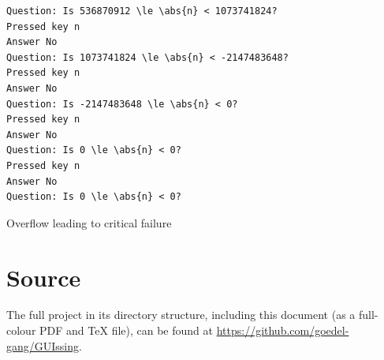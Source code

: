 \documentclass[a4paper,11pt]{article}
\begin{document}
\begin{longlisting}
\begin{verbatim}
Question: Is 536870912 \le \abs{n} < 1073741824?
Pressed key n
Answer No
Question: Is 1073741824 \le \abs{n} < -2147483648?
Pressed key n
Answer No
Question: Is -2147483648 \le \abs{n} < 0?
Pressed key n
Answer No
Question: Is 0 \le \abs{n} < 0?
Pressed key n
Answer No
Question: Is 0 \le \abs{n} < 0?
\end{verbatim}
\caption{Overflow leading to critical failure}\label{lst:overflow}
\end{longlisting}

    \section{Source}

    The full project in its directory structure, including this document (as a
    full-colour PDF and \TeX{} file), can be found at
    \url{https://github.com/goedel-gang/GUIssing}.
\end{document}
